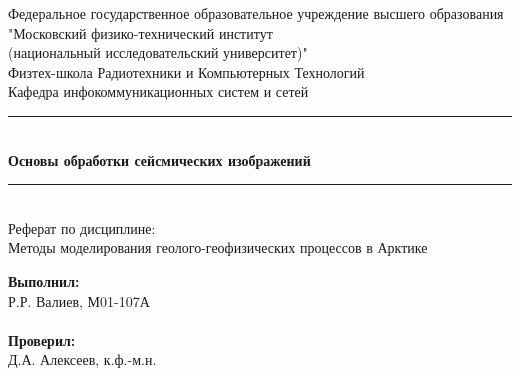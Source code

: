 \begin{titlepage}
	
	\begin{center}
		\textnormal{\normalsize Федеральное государственное образовательное учреждение высшего образования\\
			"Московский физико-технический институт\\
			(национальный исследовательский университет)"}\\[1cm]
		\textnormal{Физтех-школа Радиотехники и Компьютерных Технологий}\\[0,5cm]
		\textnormal{Кафедра инфокоммуникационных систем и сетей}\\[2.5cm]
		
		\noindent\rule{\textwidth}{1pt}
		\\[0.5cm]
		{ \huge \bfseries Основы обработки сейсмических изображений}
		\\[0.1cm]
		\noindent\rule{\textwidth}{1pt}
		\\[1cm]
		\textnormal{Реферат по дисциплине:\\
			Методы моделирования геолого-геофизических процессов в Арктике}
	\end{center}
	\vfill
	\hfill
	\begin{minipage}[b]{0.3\textwidth}
		\textbf{Выполнил:}\\
		Р.Р. Валиев, М01-107А\\\\
		\textbf{Проверил:}\\
		Д.А. Алексеев, к.ф.-м.н.
	\end{minipage}
	
\end{titlepage}